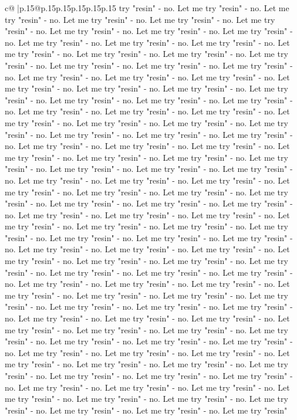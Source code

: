\documentclass{article}
\begin{document}
{\begin{supertabular}{c@{$\;$}|p{.15\linewidth}@{}p{.15\linewidth}p{.15\linewidth}p{.15\linewidth}p{.15\linewidth}p{.15\linewidth}}
{{{try "resin" {-} no. Let me try "resin" {-} no. Let me try "resin" {-} no. Let me try "resin" {-} no. Let me try "resin" {-} no. Let me try "resin" {-} no. Let me try "resin" {-} no. Let me try "resin" {-} no. Let me try "resin" {-} no. Let me try "resin" {-} no. Let me try "resin" {-} no. Let me try "resin" {-} no. Let me try "resin" {-} no. Let me try "resin" {-} no. Let me try "resin" {-} no. Let me try "resin" {-} no. Let me try "resin" {-} no. Let me try "resin" {-} no. Let me try "resin" {-} no. Let me try "resin" {-} no. Let me try "resin" {-} no. Let me try "resin" {-} no. Let me try "resin" {-} no. Let me try "resin" {-} no. Let me try "resin" {-} no. Let me try "resin" {-} no. Let me try "resin" {-} no. Let me try "resin" {-} no. Let me try "resin" {-} no. Let me try "resin" {-} no. Let me try "resin" {-} no. Let me try "resin" {-} no. Let me try "resin" {-} no. Let me try "resin" {-} no. Let me try "resin" {-} no. Let me try "resin" {-} no. Let me try "resin" {-} no. Let me try "resin" {-} no. Let me try "resin" {-} no. Let me try "resin" {-} no. Let me try "resin" {-} no. Let me try "resin" {-} no. Let me try "resin" {-} no. Let me try "resin" {-} no. Let me try "resin" {-} no. Let me try "resin" {-} no. Let me try "resin" {-} no. Let me try "resin" {-} no. Let me try "resin" {-} no. Let me try "resin" {-} no. Let me try "resin" {-} no. Let me try "resin" {-} no. Let me try "resin" {-} no. Let me try "resin" {-} no. Let me try "resin" {-} no. Let me try "resin" {-} no. Let me try "resin" {-} no. Let me try "resin" {-} no. Let me try "resin" {-} no. Let me try "resin" {-} no. Let me try "resin" {-} no. Let me try "resin" {-} no. Let me try "resin" {-} no. Let me try "resin" {-} no. Let me try "resin" {-} no. Let me try "resin" {-} no. Let me try "resin" {-} no. Let me try "resin" {-} no. Let me try "resin" {-} no. Let me try "resin" {-} no. Let me try "resin" {-} no. Let me try "resin" {-} no. Let me try "resin" {-} no. Let me try "resin" {-} no. Let me try "resin" {-} no. Let me try "resin" {-} no. Let me try "resin" {-} no. Let me try "resin" {-} no. Let me try "resin" {-} no. Let me try "resin" {-} no. Let me try "resin" {-} no. Let me try "resin" {-} no. Let me try "resin" {-} no. Let me try "resin" {-} no. Let me try "resin" {-} no. Let me try "resin" {-} no. Let me try "resin" {-} no. Let me try "resin" {-} no. Let me try "resin" {-} no. Let me try "resin" {-} no. Let me try "resin" {-} no. Let me try "resin" {-} no. Let me try "resin" {-} no. Let me try "resin" {-} no. Let me try "resin" {-} no. Let me try "resin" {-} no. Let me try "resin" {-} no. Let me try "resin" {-} no. Let me try "resin" {-} no. Let me try "resin" {-} no. Let me try "resin" {-} no. Let me try "resin" {-} no. Let me try "resin" {-} no. Let me try "resin" {-} no. Let me try "resin" {-} no. Let me try "resin" {-} no. Let me try "resin" {-} no. Let me try "resin" {-} no. Let me try "resin" {-} no. Let me try "resin" {-} no. Let me try "resin" {-} no. Let me try "resin" {-} no. Let me try "resin" {-} no. Let me try "resin" {-} no. Let me try "resin" {-} no. Let me try "resin" {-} no. Let me try "resin" {-} no. Let me try "resin" {-} no. Let me try "resin" }}}
\end{supertabular}}
\end{document}
